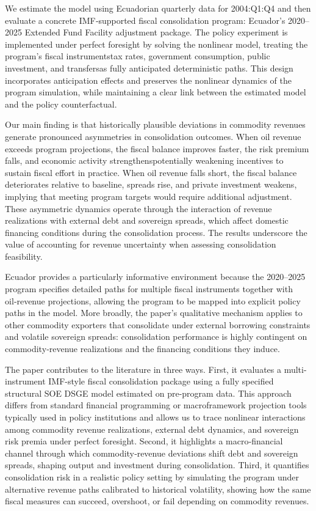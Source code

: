 \documentclass[12pt]{article}
\begin{document}
We estimate the model using Ecuadorian quarterly data for 2004:Q1:Q4 and then evaluate a concrete IMF‑supported fiscal consolidation program: Ecuador’s 2020–2025 Extended Fund Facility adjustment package. The policy experiment is implemented under perfect foresight by solving the nonlinear model, treating the program’s fiscal instruments\textemdash tax rates, government consumption, public investment, and transfers\textemdash as fully anticipated deterministic paths. This design incorporates anticipation effects and preserves the nonlinear dynamics of the program simulation, while maintaining a clear link between the estimated model and the policy counterfactual.

Our main finding is that historically plausible deviations in commodity revenues generate pronounced asymmetries in consolidation outcomes. When oil revenue exceeds program projections, the fiscal balance improves faster, the risk premium falls, and economic activity strengthens\textemdash potentially weakening incentives to sustain fiscal effort in practice. When oil revenue falls short, the fiscal balance deteriorates relative to baseline, spreads rise, and private investment weakens, implying that meeting program targets would require additional adjustment. These asymmetric dynamics operate through the interaction of revenue realizations with external debt and sovereign spreads, which affect domestic financing conditions during the consolidation process. The results underscore the value of accounting for revenue uncertainty when assessing consolidation feasibility.

Ecuador provides a particularly informative environment because the 2020–2025 program specifies detailed paths for multiple fiscal instruments together with oil‑revenue projections, allowing the program to be mapped into explicit policy paths in the model. More broadly, the paper’s qualitative mechanism applies to other commodity exporters that consolidate under external borrowing constraints and volatile sovereign spreads: consolidation performance is highly contingent on commodity‑revenue realizations and the financing conditions they induce.

The paper contributes to the literature in three ways. First, it evaluates a multi-instrument IMF-style fiscal consolidation package using a fully specified structural SOE DSGE model estimated on pre-program data. This approach differs from standard financial programming or macroframework projection tools typically used in policy institutions and allows us to trace nonlinear interactions among commodity revenue realizations, external debt dynamics, and sovereign risk premia under perfect foresight. Second, it highlights a macro‑financial channel through which commodity‑revenue deviations shift debt and sovereign spreads, shaping output and investment during consolidation. Third, it quantifies consolidation risk in a realistic policy setting by simulating the program under alternative revenue paths calibrated to historical volatility, showing how the same fiscal measures can succeed, overshoot, or fail depending on commodity revenues.
\end{document}
